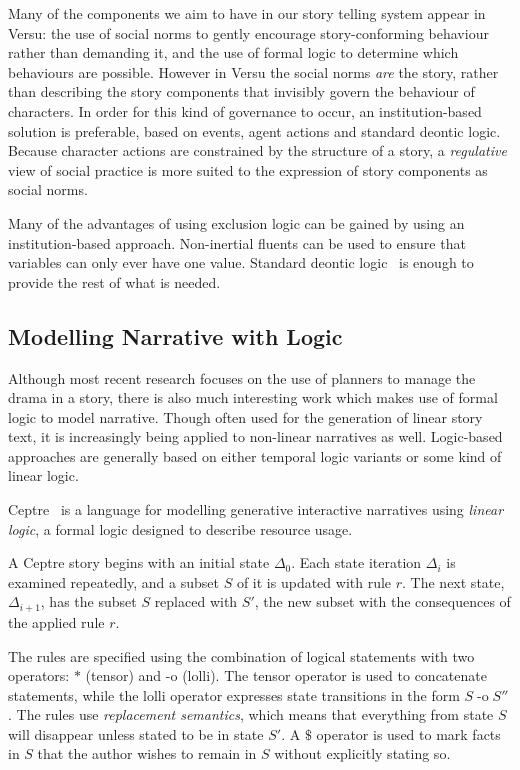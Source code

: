 \documentclass[11pt]{report}
\begin{document}
Many of the components we aim to have in our story telling system appear in Versu: the use of social norms to gently encourage story-conforming behaviour rather than demanding it, and the use of formal logic to determine which behaviours are possible. However in Versu the social norms \emph{are} the story, rather than describing the story components that invisibly govern the behaviour of characters. In order for this kind of governance to occur, an institution-based solution is preferable, based on events, agent actions and standard deontic logic. Because character actions are constrained by the structure of a story, a \emph{regulative}  view of social practice is more suited to the expression of story components as social norms.

Many of the advantages of using exclusion logic can be gained by using an institution-based approach. Non-inertial fluents can be used to ensure that variables can only ever have one value. Standard deontic logic~\citep{von1951deontic} is enough to provide the rest of what is needed.

\subsection{Modelling Narrative with Logic}
\label{sec:model-logic}
Although most recent research focuses on the use of planners to manage the drama in a story, there is also much interesting work which makes use of formal logic to model narrative. Though often used for the generation of linear story text, it is increasingly being applied to non-linear narratives as well. Logic-based approaches are generally based on either temporal logic variants or some kind of linear logic.

Ceptre~\citep{martens2015ceptre} is a language for modelling generative interactive narratives using \emph{linear logic}, a formal logic designed to describe resource usage. 

A Ceptre story begins with an initial state $\Delta_0$. Each state iteration
$\Delta_i$ is examined repeatedly, and a subset $S$ of it is updated with rule
$r$. The next state, $\Delta_{i+1}$, has the subset $S$ replaced with $S'$, the
new subset with the consequences of the applied rule $r$.

The rules are specified using the combination of logical statements with two
operators: $*$ (tensor) and $\text{-o}$ (lolli). The tensor operator is used to
concatenate statements, while the lolli operator expresses state transitions in
the form $S \mathrel{\text{-o}} S''$. The rules use \emph{replacement semantics},
which means that everything from state $S$ will disappear unless stated to be in
state $S'$. A $\$$ operator is used to mark facts in $S$ that the author wishes
to remain in $S$ without explicitly stating so.
\end{document}

